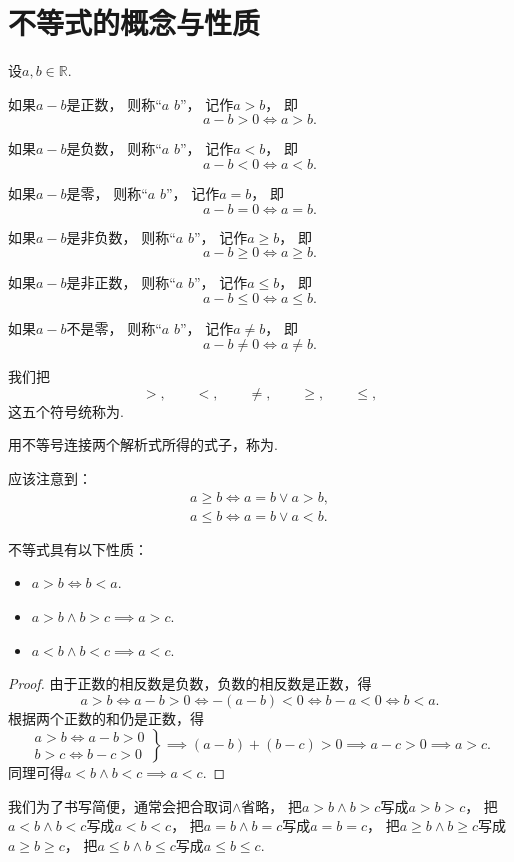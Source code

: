 \section{不等式的概念与性质}
\begin{definition}
设\(a,b\in\mathbb{R}\).

如果\(a-b\)是正数，
则称“\(a\)  \(b\)”，
记作\(a>b\)，
即\[
	a-b>0
	\iff
	a>b.
\]

如果\(a-b\)是负数，
则称“\(a\)  \(b\)”，
记作\(a<b\)，
即\[
	a-b<0
	\iff
	a<b.
\]

如果\(a-b\)是零，
则称“\(a\)  \(b\)”，
记作\(a=b\)，
即\[
	a-b=0
	\iff
	a=b.
\]

如果\(a-b\)是非负数，
则称“\(a\)  \(b\)”，
记作\(a \geq b\)，
即\[
	a-b\geq0
	\iff
	a \geq b.
\]

如果\(a-b\)是非正数，
则称“\(a\)  \(b\)”，
记作\(a \leq b\)，
即\[
	a-b\leq0
	\iff
	a \leq b.
\]

如果\(a-b\)不是零，
则称“\(a\)  \(b\)”，
记作\(a \neq b\)，
即\[
	a-b\neq0
	\iff
	a \neq b.
\]

我们把\[
	>, \qquad
	<, \qquad
	\neq, \qquad
	\geq, \qquad
	\leq,
\]这五个符号统称为.

用不等号连接两个解析式所得的式子，称为.
\end{definition}
应该注意到：\begin{gather*}
	a \geq b \iff a = b \lor a > b, \\
	a \leq b \iff a = b \lor a < b.
\end{gather*}

\begin{property}
不等式具有以下性质：\begin{itemize}
	\item \(a>b \iff b<a\).
	\item \(a>b \land b>c \implies a>c\).
	\item \(a<b \land b<c \implies a<c\).
\end{itemize}
\begin{proof}
由于正数的相反数是负数，负数的相反数是正数，得\[
	a > b \iff a-b > 0 \iff -(a-b) < 0 \iff b-a < 0 \iff b < a.
\]
根据两个正数的和仍是正数，得\[
	\left. \begin{array}{c}
		a > b \iff a-b > 0 \\
		b > c \iff b-c > 0
	\end{array} \right\}
	\implies (a-b)+(b-c) > 0
	\implies a-c > 0
	\implies a > c.
\]
同理可得\(a<b \land b<c \implies a<c\).
\end{proof}
\end{property}
我们为了书写简便，通常会把合取词\(\land\)省略，
把\(a>b \land b>c\)写成\(a>b>c\)，
把\(a<b \land b<c\)写成\(a<b<c\)，
把\(a=b \land b=c\)写成\(a=b=c\)，
把\(a \geq b \land b \geq c\)写成\(a \geq b \geq c\)，
把\(a \leq b \land b \leq c\)写成\(a \leq b \leq c\).

